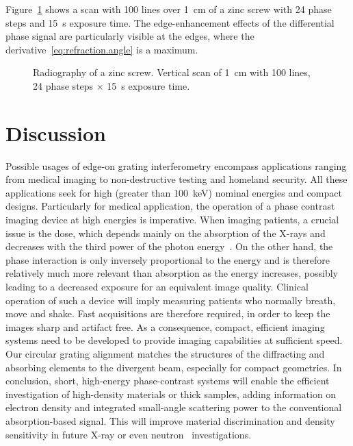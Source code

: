 Figure~\ref{fig:screw} shows a scan with \num{100} lines over
\SI{1}{\centi\metre} of a zinc screw
with \num{24} phase steps and \SI{15}{\second} exposure time.
The edge-enhancement effects of the differential phase signal are
particularly visible at the edges, where the
derivative~\eqref{eq:refraction.angle} is a maximum.

\begin{figure}[hbt]
    \centering
    
    \caption[Radiography of a zinc screw.]{Radiography of a zinc screw.
        Vertical scan of \SI{1}{\centi\metre} with \num{100} lines,
        \num{24} phase steps $\times$ \SI{15}{\second} exposure time.}
    \label{fig:screw}
\end{figure}

\section{Discussion}

Possible usages of edge-on grating interferometry encompass applications
ranging from medical imaging to non-destructive testing and homeland
security. All these applications seek for high (greater than
\SI{100}{\kilo\eV}) nominal energies
and compact designs. Particularly for medical application, the operation of
a phase contrast imaging device at high energies is imperative. When imaging
patients, a crucial issue is the dose, which depends mainly on the
absorption of the X-rays and decreases with the third power of the photon
energy~\cite{Momose2005}. On the other hand, the phase interaction is only inversely
proportional to the energy and is therefore relatively much more relevant
than absorption as the energy increases, possibly leading to a decreased
exposure for an equivalent image quality. Clinical operation of such a
device will imply measuring patients who normally breath, move and shake.
Fast acquisitions are therefore required, in order to keep the images sharp
and artifact free. As a consequence, compact, efficient imaging systems need
to be developed to provide imaging capabilities at sufficient speed. Our
circular grating alignment matches the structures of the diffracting and
absorbing elements to the divergent beam, especially for compact geometries.
In conclusion, short, high-energy phase-contrast systems will enable the
efficient investigation of high-density materials or thick samples, adding
information on electron density and integrated small-angle scattering power
to the conventional absorption-based signal. This will improve material
discrimination and density sensitivity in future X-ray or even
neutron~\cite{Grunzweig2008} investigations.

